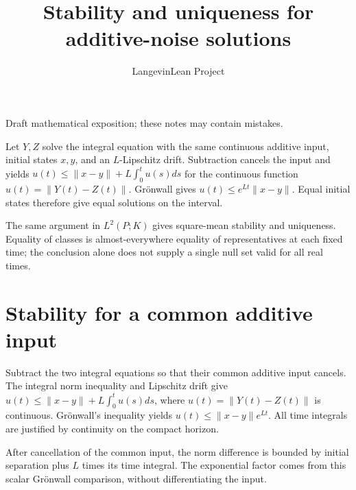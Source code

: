 \documentclass[11pt,a4paper]{article}
\title{\texorpdfstring{Stability and uniqueness for additive-noise solutions}{Stability and uniqueness for additive-noise solutions}}
\author{LangevinLean Project}
\date{}
\begin{document}
\maketitle
Draft mathematical exposition; these notes may contain mistakes.


Let \(Y,Z\) solve the integral equation with the same continuous additive input, initial states \(x,y\), and an \(L\)-Lipschitz drift. Subtraction cancels the input and yields \(u(t)\le\|x-y\|+L\int_0^tu(s)ds\) for the continuous function \(u(t)=\|Y(t)-Z(t)\|\). Grönwall gives \(u(t)\le e^{Lt}\|x-y\|\). Equal initial states therefore give equal solutions on the interval.



The same argument in \(L^2(P;K)\) gives square-mean stability and uniqueness. Equality of classes is almost-everywhere equality of representatives at each fixed time; the conclusion alone does not supply a single null set valid for all real times.


\section{\texorpdfstring{Stability for a common additive input}{Stability for a common additive input}}


Subtract the two integral equations so that their common additive input cancels. The integral norm inequality and Lipschitz drift give \(u(t)\le\|x-y\|+L\int_0^t u(s)ds\), where \(u(t)=\|Y(t)-Z(t)\|\) is continuous. Grönwall's inequality yields \(u(t)\le\|x-y\|e^{Lt}\). All time integrals are justified by continuity on the compact horizon.



After cancellation of the common input, the norm difference is bounded by initial separation plus \(L\) times its time integral. The exponential factor comes from this scalar Grönwall comparison, without differentiating the input.
\end{document}
